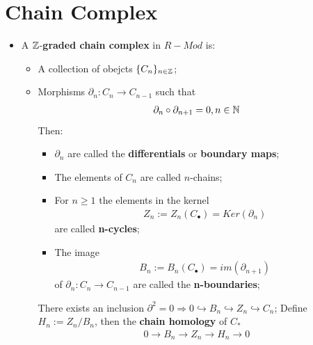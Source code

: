 \documentclass[Total.tex]{subfiles}
\begin{document}
			\section{Chain Complex}
				\begin{Def}
					\begin{itemize}
						\item A $\mathbb{Z}$-\textbf{graded chain complex} in $R-Mod$ is:
						\begin{itemize}
							\item A collection of obejcts $\{C_n\}_{n\in \mathbb{Z}}$;
							\item Morphisms $\partial_n:C_n\rightarrow C_{n-1}$ such that
							\begin{gather*}
								\partial_n\circ \partial_{n+1}=0,n\in \mathbb{N}
							\end{gather*}
							Then:
							\begin{itemize}
								\item $\partial_n$ are called the \textbf{differentials} or \textbf{boundary maps};
								\item The elements of $C_n$ are called $n$-chains;
								\item For $n\geq 1$ the elements in the kernel
								\begin{gather*}
									Z_n:=Z_n(C_\bullet)=Ker(\partial_{n})
								\end{gather*}
								are called \textbf{n-cycles};
								\item The image
								\begin{gather*}
									B_n:=B_n(C_\bullet)=im(\partial_{n+1})
								\end{gather*}
								of $\partial_n:C_{n}\rightarrow C_{n-1}$ are called the \textbf{n-boundaries};
							\end{itemize}
							There exists an inclusion $\partial^2=0\Rightarrow 0\hookrightarrow B_n\hookrightarrow Z_n\hookrightarrow C_n$; Define $H_n:=Z_n/B_n$, then the \textbf{chain homology} of $C_*$
							\begin{gather*}
								0\rightarrow B_n\rightarrow Z_n\rightarrow H_n\rightarrow 0
							\end{gather*}
						\end{itemize}
					\end{itemize}
				\end{Def}
				
\end{document}
